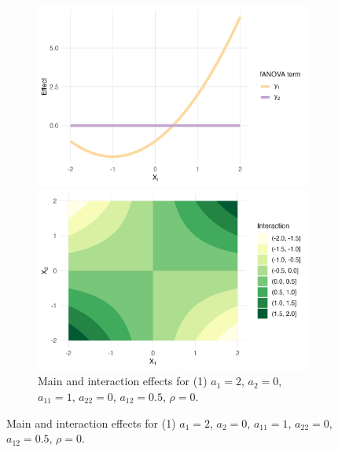 \begin{figure}[htpb]
    \centering

    \begin{subfigure}[t]{\textwidth}
        \centering
        \begin{minipage}[t]{0.49\textwidth}
            \centering
            \includegraphics[width=\textwidth]{images/experiment_section/full_a1p20_a2p00_a11p10_a22p00_a12p05_rhop00_main.png}
        \end{minipage}%
        \hfill
        \begin{minipage}[t]{0.49\textwidth}
            \centering
            \includegraphics[width=\textwidth]{images/experiment_section/full_a1p20_a2p00_a11p10_a22p00_a12p05_rhop00_interaction.png}
        \end{minipage}
        \caption{Main and interaction effects for (1) $a_1 = 2$, $a_2 = 0$, 
                 $a_{11} = 1$, $a_{22} = 0$, $a_{12} = 0.5$, $\rho = 0$.}
    \end{subfigure}


\end{figure}
